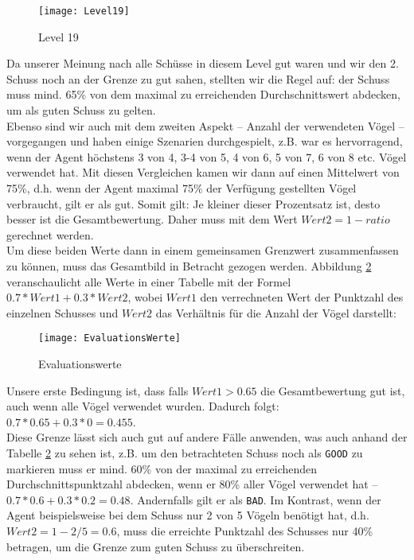 \begin{figure}[H]
  \centering
    \texttt{[image: Level19]}
   \caption{Level 19}
   \label{lvl19}
\end{figure}

Da unserer Meinung nach alle Schüsse in diesem Level gut waren und wir den 2. Schuss noch an der Grenze zu gut sahen, stellten wir die Regel auf: der Schuss muss mind. 65\% von dem maximal zu erreichenden Durchschnittswert abdecken, um als guten Schuss zu gelten. \\
Ebenso sind wir auch mit dem zweiten Aspekt -- Anzahl der verwendeten Vögel -- vorgegangen und haben einige Szenarien durchgespielt, z.B. war es hervorragend, wenn der Agent höchstens 3 von 4, 3-4 von 5, 4 von 6, 5 von 7, 6 von 8 etc. Vögel verwendet hat. Mit diesen Vergleichen kamen wir dann auf einen Mittelwert von 75\%, d.h. wenn der Agent maximal 75\% der Verfügung gestellten Vögel verbraucht, gilt er als gut. Somit gilt: Je kleiner dieser Prozentsatz ist, desto besser ist die Gesamtbewertung. Daher muss mit dem Wert $Wert2 = 1 - ratio$ gerechnet werden. \\
Um diese beiden Werte dann in einem gemeinsamen Grenzwert zusammenfassen zu können, muss das Gesamtbild in Betracht gezogen werden. Abbildung \ref{evaluation} veranschaulicht alle Werte in einer Tabelle mit der Formel $0.7 * Wert1 + 0.3 * Wert2$, wobei $Wert1$ den verrechneten Wert der Punktzahl des einzelnen Schusses und $Wert2$ das Verhältnis für die Anzahl der Vögel darstellt:

\begin{figure}[H]
  \centering
    \texttt{[image: EvaluationsWerte]}
   \caption{Evaluationswerte}
   \label{evaluation}
\end{figure}

Unsere erste Bedingung ist, dass falls $Wert1 > 0.65$ die Gesamtbewertung gut ist, auch wenn alle Vögel verwendet wurden. Dadurch folgt: $0.7 * 0.65 + 0.3 * 0 = 0.455$. \\
Diese Grenze lässt sich auch gut auf andere Fälle anwenden, was auch anhand der Tabelle \ref{evaluation} zu sehen ist, z.B. um den betrachteten Schuss noch als \texttt{GOOD} zu markieren muss er mind. 60\% von der maximal zu erreichenden Durchschnittspunktzahl abdecken, wenn er 80\% aller Vögel verwendet hat -- $0.7 * 0.6 + 0.3 * 0.2 = 0.48$. Andernfalls gilt er als \texttt{BAD}. Im Kontrast, wenn der Agent beispielsweise bei dem Schuss nur 2 von 5 Vögeln benötigt hat, d.h. $Wert2 = 1 - 2/5 = 0.6$, muss die erreichte Punktzahl des Schusses nur 40\% betragen, um die Grenze zum guten Schuss zu überschreiten.

